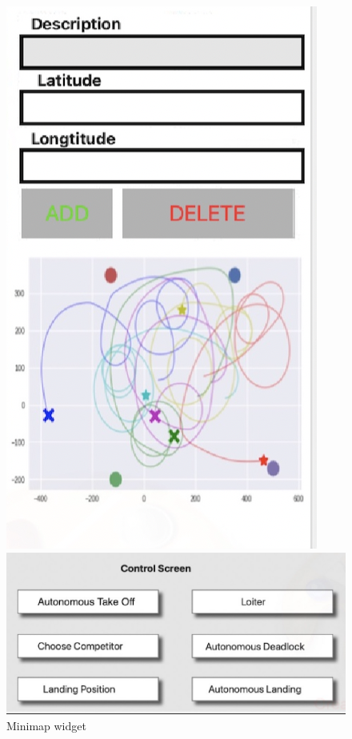 \documentclass[12pt]{article}
\begin{document}
\begin{figure}[]
     \centering
     

     \begin{minipage}[b]{0.39\textwidth}
         \centering
         \includegraphics[width=\textwidth]{gcs2.png}
 	    \caption{Minimap widget}
 	   \label{fig:Minimapwidget}
       \end{minipage}
     \hfill
     \begin{minipage}[b]{0.6\textwidth}
         \centering
         \includegraphics[width=\textwidth]{gcs4.jpg}

\end{minipage}
\end{figure}
\end{document}
